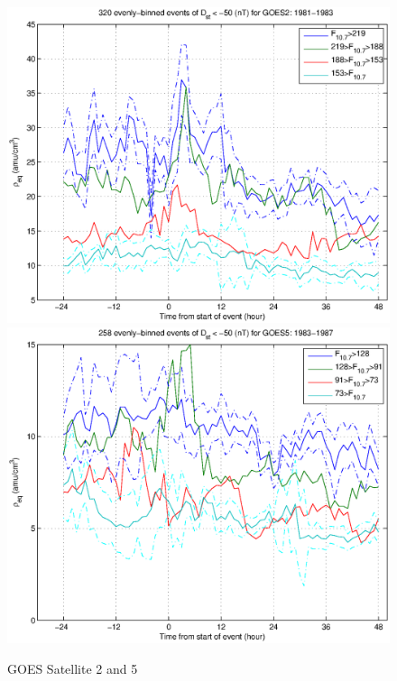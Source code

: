 \documentclass[10pt,twocolumn]{article}
\begin{document}
\begin{figure}[htp!]
\includegraphics[scale=0.45]{paperfigures/HighLowF107rhoeq-Dst50-GOES2-1981-1983.eps}
\includegraphics[scale=0.45]{paperfigures/HighLowF107rhoeq-Dst50-GOES5-1983-1987.eps}
\caption{GOES Satellite 2 and 5}
\end{figure}
\clearpage
\end{document}
